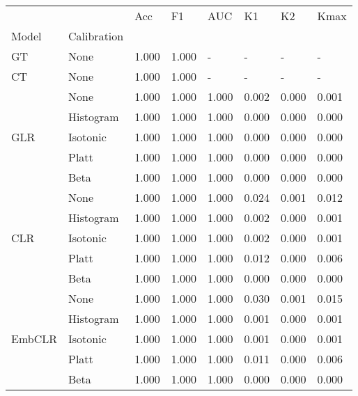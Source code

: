 \begin{tabular}{llllllll}
\toprule
 &  & Acc & F1 & AUC & K1 & K2 & Kmax \\
Model & Calibration &  &  &  &  &  &  \\
\midrule
GT & None & 1.000 & 1.000 & - & - & - & - \\
\cline{1-8}
CT & None & 1.000 & 1.000 & - & - & - & - \\
\cline{1-8}
\multirow[t]{5}{*}{GLR} & None & 1.000 & 1.000 & 1.000 & 0.002 & 0.000 & 0.001 \\
 & Histogram & 1.000 & 1.000 & 1.000 & 0.000 & 0.000 & 0.000 \\
 & Isotonic & 1.000 & 1.000 & 1.000 & 0.000 & 0.000 & 0.000 \\
 & Platt & 1.000 & 1.000 & 1.000 & 0.000 & 0.000 & 0.000 \\
 & Beta & 1.000 & 1.000 & 1.000 & 0.000 & 0.000 & 0.000 \\
\cline{1-8}
\multirow[t]{5}{*}{CLR} & None & 1.000 & 1.000 & 1.000 & 0.024 & 0.001 & 0.012 \\
 & Histogram & 1.000 & 1.000 & 1.000 & 0.002 & 0.000 & 0.001 \\
 & Isotonic & 1.000 & 1.000 & 1.000 & 0.002 & 0.000 & 0.001 \\
 & Platt & 1.000 & 1.000 & 1.000 & 0.012 & 0.000 & 0.006 \\
 & Beta & 1.000 & 1.000 & 1.000 & 0.000 & 0.000 & 0.000 \\
\cline{1-8}
\multirow[t]{5}{*}{EmbCLR} & None & 1.000 & 1.000 & 1.000 & 0.030 & 0.001 & 0.015 \\
 & Histogram & 1.000 & 1.000 & 1.000 & 0.001 & 0.000 & 0.001 \\
 & Isotonic & 1.000 & 1.000 & 1.000 & 0.001 & 0.000 & 0.001 \\
 & Platt & 1.000 & 1.000 & 1.000 & 0.011 & 0.000 & 0.006 \\
 & Beta & 1.000 & 1.000 & 1.000 & 0.000 & 0.000 & 0.000 \\
\cline{1-8}
\bottomrule
\end{tabular}
